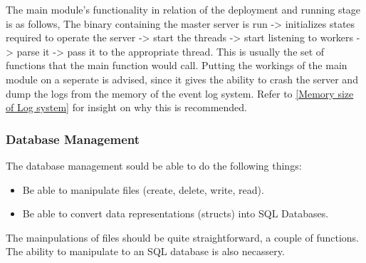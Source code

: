\documentclass[a4paper]{article}
\begin{document}
The main module's functionality in relation of the deployment and running stage
is as follows, The binary containing the master server is run -> initializes 
states required to operate the server -> start the threads -> start listening 
to workers -> parse it -> pass it to the appropriate thread. This is usually 
the set of functions that the main function would call. Putting the workings 
of the main module on a seperate is advised, since it gives the ability to
crash the server and dump the logs from the memory of the event log system.
Refer to \ref{Memory size of Log system} for insight on why this is recommended.

\subsubsection{Database Management}
The database management sould be able to do the following things:
\begin{itemize}
	\item Be able to manipulate files (create, delete, write, read).
	\item Be able to convert data representations (structs) into SQL Databases.
\end{itemize}

The mainpulations of files should be quite straightforward, a couple of
functions. The ability to manipulate to an SQL database is also necassery.
\end{document}
